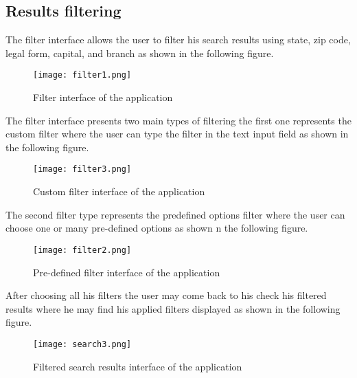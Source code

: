 \subsection{Results filtering}
The filter interface allows the user to filter his search results using state, zip code, legal form, capital, and branch as shown in the following figure.
\begin{figure}[H]%
    \center   
    
    \texttt{[image: filter1.png]}
    \caption{Filter interface of the application}
\end{figure}
The filter interface presents two main types of filtering the first one represents the custom filter where the user can type the filter in the text input field as shown in the following figure.
\begin{figure}[H]%
    \center   
    
    \texttt{[image: filter3.png]}
    \caption{Custom filter interface of the application}
\end{figure}
The second filter type represents the predefined options filter where the user can choose one or many pre-defined options as shown n the following figure.
\begin{figure}[H]%
    \center   
    
    \texttt{[image: filter2.png]}
    \caption{Pre-defined filter interface of the application}
\end{figure}
After choosing all his filters the user may come back to his check his filtered results where he may find his applied filters displayed as shown in the following figure.
  \begin{figure}[H]%
    \center   
    
    \texttt{[image: search3.png]}
    \caption{Filtered search results interface of the application}
\end{figure}
